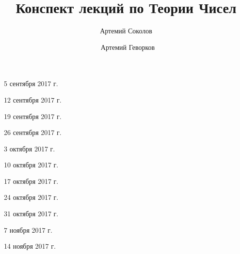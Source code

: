 \documentclass[%
  a4paper,%
  titlepage,%
  11pt%
]{article}%
\title{Конспект лекций по Теории Чисел}
\author{Артемий Соколов \and~Артемий Геворков}
\begin{document}
    
    
    \tableofcontents

    \pagestyle{fancy}

    \begin{lecture}{5 сентября 2017 г.}
        
    \end{lecture}

    \begin{lecture}{12 сентября 2017 г.}
        
    \end{lecture}

    \begin{lecture}{19 сентября 2017 г.}
        
    \end{lecture}

    \begin{lecture}{26 сентября 2017 г.}
        
    \end{lecture}

    \begin{lecture}{3 октября 2017 г.}
        
    \end{lecture}

    \begin{lecture}{10 октября 2017 г.}
        
    \end{lecture}

    \begin{lecture}{17 октября 2017 г.}
        
    \end{lecture}

    \begin{lecture}{24 октября 2017 г.}
        
    \end{lecture}

    \begin{lecture}{31 октября 2017 г.}
        
    \end{lecture}

    \begin{lecture}{7 ноября 2017 г.}
        
    \end{lecture}

    \begin{lecture}{14 ноября 2017 г.}
        
    \end{lecture}
\end{document}
